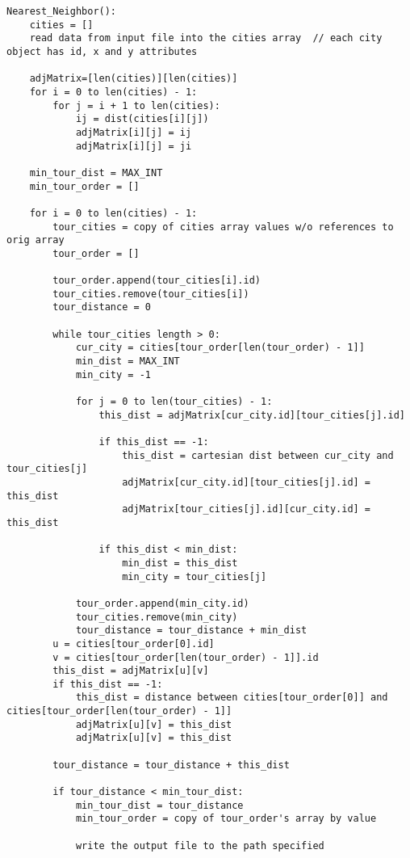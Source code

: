 \documentclass[../report/main.tex]{subfiles}
\begin{document}
\begin{verbatim}
Nearest_Neighbor():
    cities = []
    read data from input file into the cities array  // each city object has id, x and y attributes

    adjMatrix=[len(cities)][len(cities)]
    for i = 0 to len(cities) - 1:
        for j = i + 1 to len(cities):
            ij = dist(cities[i][j])
            adjMatrix[i][j] = ij
            adjMatrix[i][j] = ji

    min_tour_dist = MAX_INT
    min_tour_order = []

    for i = 0 to len(cities) - 1:
        tour_cities = copy of cities array values w/o references to orig array
        tour_order = []

        tour_order.append(tour_cities[i].id)
        tour_cities.remove(tour_cities[i])
        tour_distance = 0

        while tour_cities length > 0:
            cur_city = cities[tour_order[len(tour_order) - 1]]
            min_dist = MAX_INT
            min_city = -1

            for j = 0 to len(tour_cities) - 1:
                this_dist = adjMatrix[cur_city.id][tour_cities[j].id]

                if this_dist == -1:
                    this_dist = cartesian dist between cur_city and tour_cities[j]
                    adjMatrix[cur_city.id][tour_cities[j].id] = this_dist
                    adjMatrix[tour_cities[j].id][cur_city.id] = this_dist

                if this_dist < min_dist:
                    min_dist = this_dist
                    min_city = tour_cities[j]

            tour_order.append(min_city.id)
            tour_cities.remove(min_city)
            tour_distance = tour_distance + min_dist
        u = cities[tour_order[0].id]
        v = cities[tour_order[len(tour_order) - 1]].id
        this_dist = adjMatrix[u][v]
        if this_dist == -1:
            this_dist = distance between cities[tour_order[0]] and cities[tour_order[len(tour_order) - 1]]
            adjMatrix[u][v] = this_dist
            adjMatrix[u][v] = this_dist

        tour_distance = tour_distance + this_dist

        if tour_distance < min_tour_dist:
            min_tour_dist = tour_distance
            min_tour_order = copy of tour_order's array by value 

            write the output file to the path specified
\end{verbatim}
\end{document}
